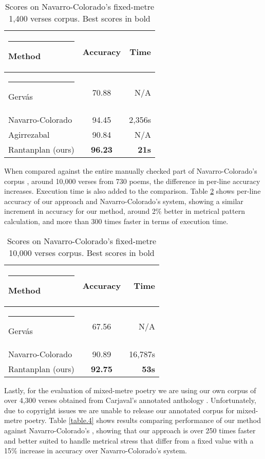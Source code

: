 \documentclass[a4paper,11pt,twocolumn,twoside]{article}
\begin{document}
\begin{table} [htbp]
\begin{center}
\begin{tabular} {lcr}
  \hline\rule{-2pt}{15pt}
  {\bf Method} & {\bf Accuracy} & {\bf Time}\\
  \hline\rule{-4pt}{10pt}
Gervás\footnotemark & 70.88 & N/A \\
Navarro-Colorado & 94.45 & 2,356s \\
Agirrezabal & 90.84 & N/A\\
Rantanplan (ours) & \textbf{96.23} & \textbf{21s} \\
\hline
\end{tabular}
\end{center}
\caption{\label{table.2}Scores on Navarro-Colorado's fixed-metre 1,400 verses corpus. Best scores in bold}
\end{table}

When compared against the entire manually checked part of  Navarro-Colorado's corpus , around 10,000 verses from 730 poems, the difference in per-line accuracy increases. Execution time is also added to the comparison. Table \ref{table.3} shows per-line accuracy of our approach and Navarro-Colorado's system, showing a similar increment in accuracy for our method, around 2\% better in metrical pattern calculation, and more than 300 times faster in terms of execution time.

\begin{table} [htbp]
\begin{center}
\begin{tabular} {lcr}
  \hline\rule{-2pt}{15pt}
  {\bf Method} & {\bf Accuracy} & {\bf Time}\\
  \hline\rule{-4pt}{10pt}
Gervás\footnotemark & 67.56 & N/A \\
Navarro-Colorado & 90.89 & 16,787s \\
Rantanplan (ours) & \textbf{92.75} & \textbf{53s}\\
\hline
\end{tabular}
\end{center}
\caption{\label{table.3}Scores on Navarro-Colorado's fixed-metre 10,000 verses corpus. Best scores in bold}
\end{table}

Lastly, for the evaluation of mixed-metre poetry we are using our own corpus of over 4,300 verses obtained from Carjaval's annotated anthology . Unfortunately, due to copyright issues we are unable to release our annotated corpus for mixed-metre poetry. Table \ref{table.4} shows results comparing performance of our method against Navarro-Colorado's , showing that our approach is over 250 times faster and better suited to handle metrical stress that differ from a fixed value with a 15\% increase in accuracy over Navarro-Colorado's system.
\end{document}
